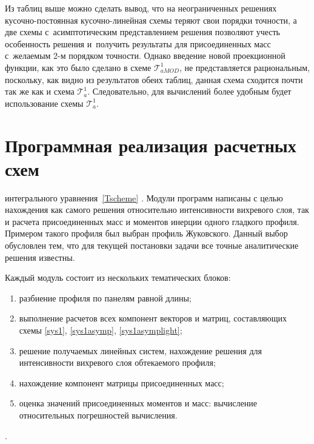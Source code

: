 \documentclass[12pt, a4paper]{article}
\begin{document}
Из таблиц выше можно сделать вывод, что на неограниченных решениях кусочно-постоянная  кусочно-линейная схемы теряют свои порядки точности, а две схемы с~асимптотическим представлением решения позволяют учесть особенность решения и~получить результаты для присоединенных масс с~желаемым 2-м порядком точности. Однако введение новой проекционной функции, как это было сделано в схеме $\mathcal{T}^1_{aMOD}$, не представляется рациональным, поскольку, как видно из результатов обеих таблиц, данная схема сходится почти так же как и схема $\mathcal{T}^1_a$. Следовательно, для вычислений более удобным будет использование схемы $\mathcal{T}^1_a$.

\section{Программная реализация расчетных схем}

 интегрального уравнения~\eqref{Tscheme} . Модули программ написаны с целью нахождения как самого решения относительно интенсивности вихревого слоя, так и расчета присоединенных масс и моментов инерции одного гладкого профиля. Примером такого профиля был выбран профиль Жуковского. Данный выбор обусловлен тем, что для текущей постановки задачи все точные аналитические решения известны. 

Каждый модуль состоит из нескольких тематических блоков:
\begin{enumerate}
	\item разбиение профиля по панелям равной длины;
	\item выполнение расчетов всех компонент векторов и матриц, составляющих схемы \eqref{sys1}, \eqref{sys1asymp}, \eqref{sys1asymplight};
	\item решение получаемых линейных систем, нахождение решения для интенсивности вихревого слоя обтекаемого профиля;
	\item нахождение компонент матрицы присоединенных масс;
	\item оценка значений присоединенных моментов и масс: вычисление относительных погрешностей вычисления.
\end{enumerate}

.
\end{document}
